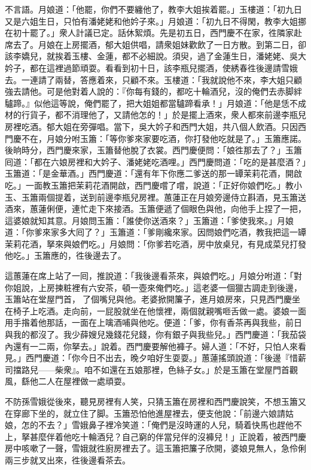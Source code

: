 不言語。{}月娘道：「他罷，你們不要纏他了，教李大姐挨着罷。」玉樓道：「初九日又是六姐生日，只怕有潘姥姥和他妗子來。」月娘道：「初九日不得閑，教李大姐挪在初十罷了。」衆人計議已定。話休絮煩。先是初五日，西門慶不在家，徃隣家赴席去了。月娘在上房擺酒，郁大姐供唱，請衆姐妹歡飲了一日方散。到第二日，卻該李嬌兒，就挨着玉樓、金蓮，都不必細說。須臾，過了金蓮生日，潘姥姥、吳大妗子，都在這裡過節頑耍。看看到初十日，該李瓶兒擺酒，使綉春徃後邊請雪娥去。一連請了兩替，答應着來，只顧不來。{}玉樓道：「我就說他不來，李大姐只顧強去請他。可是他對着人說的：『你每有錢的，都吃十輪酒兒，沒的俺們去赤脚絆驢蹄。』似他這等說，俺們罷了，把大姐姐都當驢蹄看承！」{}月娘道：「他是恁不成材的行貨子，都不消理他了，又請他怎的！」於是擺上酒來，衆人都來前邊李瓶兒房裡吃酒。郁大姐在旁彈唱。當下，吳大妗子和西門大姐，共八個人飲酒。只因西門慶不在，月娘分咐玉簫：「等你爹來家要吃酒，你打發他吃就是了。」玉簫應諾。後晌時分，西門慶來家，玉簫替他脫了衣裳。西門慶便問：「娘徃那去了？」玉簫囘道：「都在六娘房裡和大妗子、潘姥姥吃酒哩。」西門慶問道：「吃的是甚麼酒？」玉簫道：「是金華酒。」西門慶道：「還有年下你應二爹送的那一罈茉莉花酒，開啟吃。」一面教玉簫把茉莉花酒開啟，西門慶嚐了嚐，說道：「正好你娘們吃。」教小玉、玉簫兩個提着，送到前邊李瓶兒房裡。蕙蓮正在月娘旁邊侍立斟酒，見玉簫送酒來，蕙蓮俐便，連忙走下來接酒。玉簫便遞了個眼色與他，向他手上捏了一把，{}這婆娘就知其意。月娘問玉簫：「誰使你送酒來？」玉簫道：「爹使我來。」月娘道：「你爹來家多大囘了？」玉簫道：「爹剛纔來家。因問娘們吃酒，教我把這一罈茉莉花酒，拏來與娘們吃。」月娘問：「你爹若吃酒，房中放桌兒，有見成菜兒打發他吃。」玉簫應的，徃後邊去了。

這蕙蓮在席上站了一囘，推說道：「我後邊看茶來，與娘們吃。」月娘分咐道：「對你姐說，上房揀粧裡有六安茶，頓一壺來俺們吃。」這老婆一個獵古調走到後邊，玉簫站在堂屋門首，𢫓了個嘴兒與他。老婆掀開簾子，進月娘房來，只見西門慶坐在椅子上吃酒。走向前，一屁股就坐在他懷裡，{}兩個就親嘴咂舌做一處。婆娘一面用手揝着他那話，一面在上噙酒哺與他吃。便道：「爹，你有香茶再與我些，前日與我的都沒了。我少薛嫂兒幾錢花兒錢，你有銀子與我些兒。」{}西門慶道：「我茄袋內還有一二兩，你拏去。」說着。西門慶要解他褲子。婦人道：「不好，只怕人來看見。」西門慶道：「你今日不出去，晚夕咱好生耍耍。」蕙蓮搖頭說道：「後邊『惜薪司擋路兒——柴衆』。咱不如還在五娘那裡，色絲子女。」於是玉簫在堂屋門首觀風，繇他二人在屋裡做一處頑耍。

不防孫雪娥從後來，聽見房裡有人笑，只猜玉簫在房裡和西門慶說笑，不想玉簫又在穿廊下坐的，就立住了脚。玉簫恐怕他進屋裡去，便支他說：「前邊六娘請姑娘，怎的不去？」雪娥鼻子裡冷笑道：{}「俺們是沒時運的人兒，{}騎着快馬也趕他不上，拏甚麼伴着他吃十輪酒兒？自己窮的伴當兒伴的沒褲兒！」正說着，被西門慶房中咳嗽了一聲，雪娥就徃廚房裡去了。這玉簫把簾子欣開，婆娘見無人，急伶俐兩三步就叉出來，{}徃後邊看茶去。

